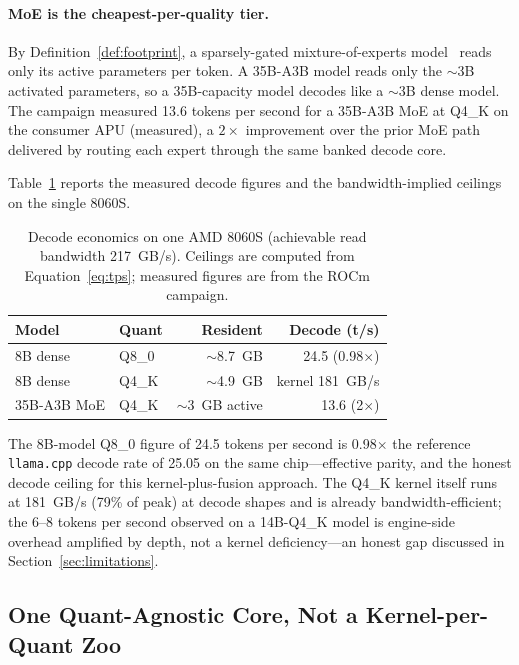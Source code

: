 \documentclass[11pt]{article}
\begin{document}
\paragraph{MoE is the cheapest-per-quality tier.} By Definition~\ref{def:footprint}, a sparsely-gated mixture-of-experts model~\cite{shazeer2017} reads only its active parameters per token. A 35B-A3B model reads only the $\sim$3B activated parameters, so a 35B-capacity model decodes like a $\sim$3B dense model. The campaign measured 13.6 tokens per second for a 35B-A3B MoE at Q4\_K on the consumer APU (measured), a $2\times$ improvement over the prior MoE path delivered by routing each expert through the same banked decode core.

Table~\ref{tab:roofline} reports the measured decode figures and the bandwidth-implied ceilings on the single 8060S.

\begin{table}[h]
\centering
\caption{Decode economics on one AMD 8060S (achievable read bandwidth 217~GB/s). Ceilings are computed from Equation~\eqref{eq:tps}; measured figures are from the ROCm campaign.}
\label{tab:roofline}
\begin{tabular}{@{}llrr@{}}
\toprule
\textbf{Model} & \textbf{Quant} & \textbf{Resident} & \textbf{Decode (t/s)} \\
\midrule
8B dense        & Q8\_0 & $\sim$8.7~GB        & 24.5 (0.98$\times$) \\
8B dense        & Q4\_K & $\sim$4.9~GB        & kernel 181~GB/s \\
35B-A3B MoE     & Q4\_K & $\sim$3~GB active   & 13.6 (2$\times$) \\
\bottomrule
\end{tabular}
\end{table}

The 8B-model Q8\_0 figure of 24.5 tokens per second is 0.98$\times$ the reference \texttt{llama.cpp} decode rate of 25.05 on the same chip---effective parity, and the honest decode ceiling for this kernel-plus-fusion approach. The Q4\_K kernel itself runs at 181~GB/s (79\% of peak) at decode shapes and is already bandwidth-efficient; the 6--8 tokens per second observed on a 14B-Q4\_K model is engine-side overhead amplified by depth, not a kernel deficiency---an honest gap discussed in Section~\ref{sec:limitations}.

\subsection{One Quant-Agnostic Core, Not a Kernel-per-Quant Zoo}
\end{document}
